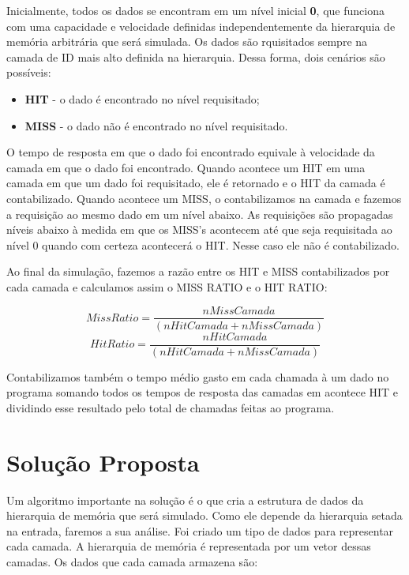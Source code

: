 \documentclass[12pt]{article}
\begin{document}
Inicialmente, todos os dados se encontram em um nível inicial \textbf{0}, que funciona com uma capacidade e velocidade 
definidas independentemente da hierarquia de memória arbitrária que será simulada. Os dados são rquisitados sempre na 
camada de ID mais alto definida na hierarquia. Dessa forma, dois cenários são possíveis:

\begin{itemize}
  \item \textbf{HIT} - o dado é encontrado no nível requisitado;
  \item \textbf{MISS} - o dado não é encontrado no nível requisitado.
\end{itemize}

O tempo de resposta em que o dado foi encontrado equivale à velocidade da camada em que o dado foi encontrado. Quando 
acontece um HIT em uma camada em que um dado foi requisitado, ele é retornado e o HIT da camada é contabilizado. Quando 
acontece um MISS, o contabilizamos na camada e fazemos a requisição ao mesmo dado em um nível abaixo. As requisições 
são propagadas níveis abaixo à medida em que os MISS's acontecem até que seja requisitada ao nível 0 quando com certeza
acontecerá o HIT. Nesse caso ele não é contabilizado.

Ao final da simulação, fazemos a razão entre os HIT e MISS contabilizados por cada camada e calculamos assim o MISS RATIO 
e o HIT RATIO:
\begin{center}
\[MissRatio = \frac{nMissCamada}{(nHitCamada + nMissCamada)}\]
\[HitRatio = \frac{nHitCamada}{(nHitCamada + nMissCamada)}\]
\end{center}

Contabilizamos também o tempo médio gasto em cada chamada à um dado no programa somando todos os tempos de resposta das
camadas em acontece HIT e dividindo esse resultado pelo total de chamadas feitas ao programa.

\section{Solução Proposta}
\label{solucao_proposta}

Um algoritmo importante na solução é o que cria a estrutura de dados da hierarquia de memória que será simulado. Como ele
depende da hierarquia setada na entrada, faremos a sua análise. Foi criado um tipo de dados para representar cada camada.
A hierarquia de memória é representada por um vetor dessas camadas. Os dados que cada camada armazena são:
\end{document}

